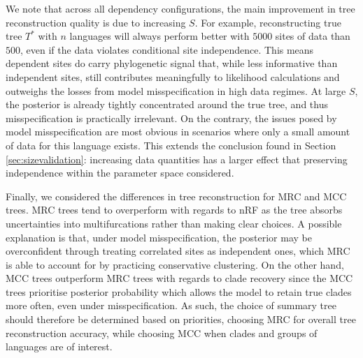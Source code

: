 We note that across all dependency configurations, the main improvement in tree reconstruction quality is due to increasing $S$. For example, reconstructing true tree $T^*$ with $n$ languages will always perform better with $5000$ sites of data than $500$, even if the data violates conditional site independence. This means dependent sites do carry phylogenetic signal that, while less informative than independent sites, still contributes meaningfully to likelihood calculations and outweighs the losses from model misspecification in high data regimes. At large $S$, the posterior is already tightly concentrated around the true tree, and thus misspecification is practically irrelevant. On the contrary, the issues posed by model misspecification are most obvious in scenarios where only a small amount of data for this language exists. This extends the conclusion found in Section \ref{sec:sizevalidation}: increasing data quantities has a larger effect that preserving independence within the parameter space considered.

Finally, we considered the differences in tree reconstruction for MRC and MCC trees. MRC trees tend to overperform with regards to nRF as the tree absorbs uncertainties into multifurcations rather than making clear choices. A possible explanation is that, under model misspecification, the posterior may be overconfident through treating correlated sites as independent ones, which MRC is able to account for by practicing conservative clustering. On the other hand, MCC trees outperform MRC trees with regards to clade recovery since the MCC trees prioritise posterior probability which allows the model to retain true clades more often, even under misspecification. As such, the choice of summary tree should therefore be determined based on priorities, choosing MRC for overall tree reconstruction accuracy, while choosing MCC when clades and groups of languages are of interest.

